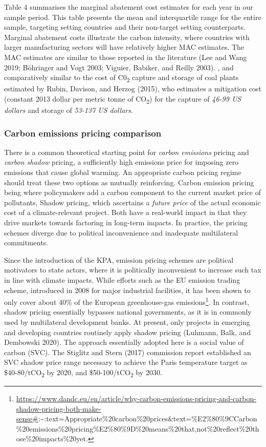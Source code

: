 \documentclass[
  10pt,
]{article}
\begin{document}
Table 4 summarises the marginal abatement cost estimates for each year
in our sample period. This table presents the mean and interquartile
range for the entire sample, targeting setting countries and their
non-target setting counterparts. Marginal abatement costs illustrate the
carbon intensity, where countries with larger manufacturing sectors will
have relatively higher MAC estimates. The MAC estimates are similar to
those reported in the literature (Lee and Wang 2019; Böhringer and Vogt
2003; Viguier, Babiker, and Reilly 2003). , and comparatively similar to
the cost of C0\textsubscript{2} capture and storage of coal plants
estimated by Rubin, Davison, and Herzog (2015), who estimates a
mitigation cost (constant 2013 dollar per metric tonne of
CO\textsubscript{2}) for the capture of \emph{46-99 US dollars} and
storage of \emph{53-137 US dollars}.

\hypertarget{carbon-emissions-pricing-comparison}{%
\subsubsection{Carbon emissions pricing
comparison}\label{carbon-emissions-pricing-comparison}}

There is a common theoretical starting point for \emph{carbon emissions}
pricing and \emph{carbon shadow} pricing, a sufficiently high emissions
price for imposing zero emissions that cause global warming. An
appropriate carbon pricing regime should treat these two options as
mutually reinforcing. Carbon emission pricing being where policymakers
add a carbon component to the current market price of pollutants, Shadow
pricing, which ascertains a \emph{future price} of the actual economic
cost of a climate-relevant project. Both have a real-world impact in
that they drive markets towards factoring in long-term impacts. In
practice, the pricing schemes diverge due to political inconvenience and
inadequate multilateral commitments.

Since the introduction of the KPA, emission pricing schemes are
political motivators to state actors, where it is politically
inconvenient to increase such tax in line with climate impacts. While
efforts such as the EU emission trading scheme, introduced in 2008 for
major industrial facilities, it has been shown to only cover about 40\%
of the European greenhouse-gas emissions\footnote{\url{https://www.dandc.eu/en/article/why-carbon-emissions-pricing-and-carbon-shadow-pricing-both-make-sense\#}:\textasciitilde:text=Appropriate\%20carbon\%20prices\&text=\%E2\%80\%9CCarbon\%20emissions\%20pricing\%E2\%80\%9D\%20means\%20that,not\%20reflect\%20those\%20impacts\%20yet.}.
In contrast, shadow pricing essentially bypasses national governments,
as it is in commonly used by multilateral development banks. At present,
only projects in emerging and developing countries routinely apply
shadow pricing (Luhmann, Balk, and Dembowski 2020). The approach
essentially adopted here is a social value of carbon (SVC). The Stiglitz
and Stern (2017) commission report established an SVC shadow price range
necessary to achieve the Paris temperature target as
\$40-80/tCO\textsubscript{2} by 2020, and \$50-100/tCO\textsubscript{2}
by 2030.
\end{document}
